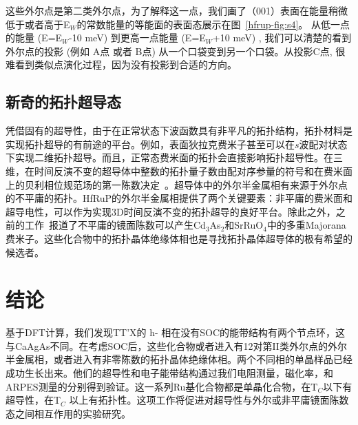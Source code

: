 这些外尔点是第二类外尔点，为了解释这一点，我们画了（001）表面在能量稍微低于或者高于E$_{W}$的常数能量的等能面的表面态展示在图~\ref{hfrup-fig:s4}。
从低一点的能量 (E=E$_W$-10 meV) 到更高一点能量 (E=E$_W$+10 meV) , 我们可以清楚的看到外尔点的投影 (例如 A点 或者 B点) 从一个口袋变到另一个口袋。从投影C点, 很难看到类似点演化过程，因为没有投影到合适的方向。

\subsection{新奇的拓扑超导态}
凭借固有的超导性，由于在正常状态下波函数具有非平凡的拓扑结构，拓扑材料是实现拓扑超导的有前途的平台。例如，表面狄拉克费米子甚至可以在$ s $波配对状态下实现二维拓扑超导\citep{Fu2008superconducting,wang2015}。而且，正常态费米面的拓扑会直接影响拓扑超导性。在三维，在时间反演不变的超导体中整数的拓扑量子数由配对序参量的符号和在费米面上的贝利相位规范场的第一陈数决定~\citep{qi2011}。超导体中的外尔半金属相有来源于外尔点的不平庸的拓扑。HfRuP的外尔半金属相提供了两个关键要素：非平庸的费米面和超导电性，可以作为实现3D时间反演不变的拓扑超导的良好平台。除此之外，之前的工作~\citep{shingo2015,ueno2013}报道了不平庸的镜面陈数可以产生Cd$_3$As$_2$和SrRuO$_4$中的多重Majorana费米子。这些化合物中的拓扑晶体绝缘体相也是寻找拓扑晶体超导体的极有希望的候选者。
    
\section{结论}
基于DFT计算，我们发现TT'X的 h- 相在没有SOC的能带结构有两个节点环，这与CaAgAs不同。在考虑SOC后，这些化合物或者进入有12对第II类外尔点的外尔半金属相，或者进入有非零陈数的拓扑晶体绝缘体相。两个不同相的单晶样品已经成功生长出来。他们的超导性和电子能带结构通过我们电阻测量，磁化率，和ARPES测量的分别得到验证。这一系列Ru基化合物都是单晶化合物，在T$_C$以下有超导性，在T$_C$ 以上有拓扑性。这项工作将促进对超导性与外尔或非平庸镜面陈数态之间相互作用的实验研究。
 
